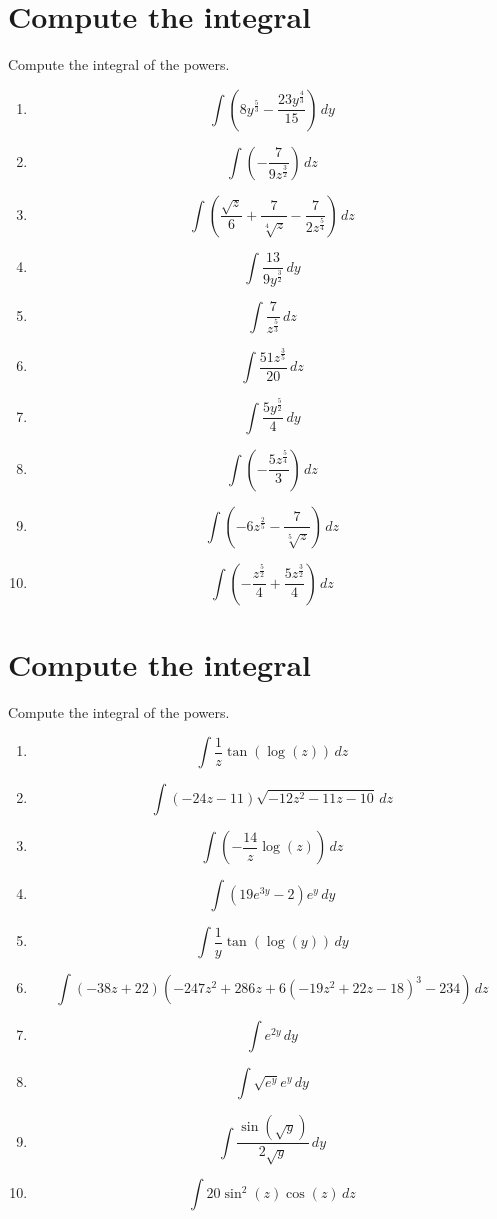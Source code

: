 \documentclass{article}
\begin{document}
        \section{Compute the integral}
        Compute the integral of the powers.
        \begin{multicols}{1}
        \begin{enumerate}
        \item $$\int \left(8 y^{\frac{5}{3}} - \frac{23 y^{\frac{4}{3}}}{15}\right)\, dy$$
\item $$\int \left(- \frac{7}{9 z^{\frac{3}{2}}}\right)\, dz$$
\item $$\int \left(\frac{\sqrt{z}}{6} + \frac{7}{\sqrt[4]{z}} - \frac{7}{2 z^{\frac{5}{4}}}\right)\, dz$$
\item $$\int \frac{13}{9 y^{\frac{3}{2}}}\, dy$$
\item $$\int \frac{7}{z^{\frac{5}{3}}}\, dz$$
\item $$\int \frac{51 z^{\frac{3}{5}}}{20}\, dz$$
\item $$\int \frac{5 y^{\frac{5}{2}}}{4}\, dy$$
\item $$\int \left(- \frac{5 z^{\frac{5}{4}}}{3}\right)\, dz$$
\item $$\int \left(- 6 z^{\frac{2}{5}} - \frac{7}{\sqrt[5]{z}}\right)\, dz$$
\item $$\int \left(- \frac{z^{\frac{5}{2}}}{4} + \frac{5 z^{\frac{3}{2}}}{4}\right)\, dz$$
        \end{enumerate}
        \end{multicols}
        

        \section{Compute the integral}
        Compute the integral of the powers.
        \begin{multicols}{1}
        \begin{enumerate}
        \item $$\int \frac{1}{z} \tan{\left (\log{\left (z \right )} \right )}\, dz$$
\item $$\int \left(- 24 z - 11\right) \sqrt{- 12 z^{2} - 11 z - 10}\, dz$$
\item $$\int \left(- \frac{14}{z} \log{\left (z \right )}\right)\, dz$$
\item $$\int \left(19 e^{3 y} - 2\right) e^{y}\, dy$$
\item $$\int \frac{1}{y} \tan{\left (\log{\left (y \right )} \right )}\, dy$$
\item $$\int \left(- 38 z + 22\right) \left(- 247 z^{2} + 286 z + 6 \left(- 19 z^{2} + 22 z - 18\right)^{3} - 234\right)\, dz$$
\item $$\int e^{2 y}\, dy$$
\item $$\int \sqrt{e^{y}} e^{y}\, dy$$
\item $$\int \frac{\sin{\left (\sqrt{y} \right )}}{2 \sqrt{y}}\, dy$$
\item $$\int 20 \sin^{2}{\left (z \right )} \cos{\left (z \right )}\, dz$$
        \end{enumerate}
        \end{multicols}
        

    
\end{document}
